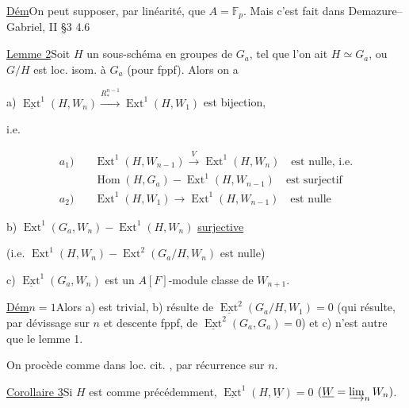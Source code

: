 \uline{Dém}\quad On peut supposer, par linéarité, que $A=\mathbb F_p$.
Mais c'est fait dans Demazure--Gabriel, II \S 3 4.6

\uline{Lemme 2}\quad Soit $H$ un sous-schéma en groupes de $G_a$, tel
 que l'on ait $H\simeq G_a$, ou
$G/H$ est loc. isom. à $G_a$ (pour fppf).
Alors on a

a) $\underline{\operatorname{Ext}}^1(H,W_n)
\xrightarrow{R_*^{n-1}}\operatorname{Ext}^1(H,W_1)$ est bijection,

i.e. 

\[
\begin{aligned}
a_1)\quad&
\operatorname{Ext}^1(H,W_{n-1})\xrightarrow{V}\operatorname{Ext}^1(H,W_n)
\quad\text{est nulle, i.e.}\\
&\operatorname{Hom}(H,G_a)-\operatorname{Ext}^1(H,W_{n-1})
\quad\text{est surjectif}\\
a_2)\quad&
\operatorname{Ext}^1(H,W_1)\longrightarrow\operatorname{Ext}^1(H,W_{n-1})
\quad\text{est nulle}
\end{aligned}
\]

b) $\operatorname{Ext}^1(G_a,W_n)-\operatorname{Ext}^1(H,W_n)$
\uline{surjective}

(i.e. $\operatorname{Ext}^1(H,W_n)-\operatorname{Ext}^2(G_a/H,W_n)$
est nulle)

c) $\underline{\operatorname{Ext}}^1(G_a,W_n)$ est un $A[F]$-module
classe  de $W_{n+1}$.

\uline{Dém}\quad \uline{$n=1$}\quad Alors a) est trivial,
b) résulte de $\underline{\operatorname{Ext}}^2(G_a/H,W_1)=0$
(qui résulte, par dévissage sur $n$ et descente fppf, de
$\underline{\operatorname{Ext}}^2(G_a,G_a)=0$)
et c) n'est autre que le lemme 1.

On procède comme dans  loc. cit.
, par récurrence sur $n$.

\uline{Corollaire 3}\quad Si $H$ est comme précédemment,
 $\underline{\operatorname{Ext}}^1(H,\underline W)=0$
$(\underline W=\varinjlim_n W_n)$.

